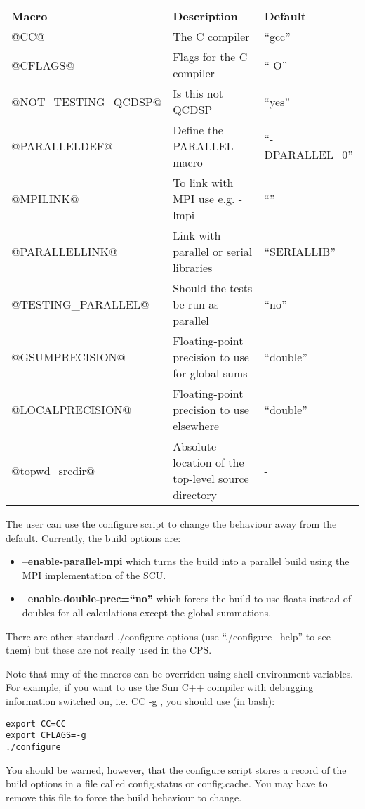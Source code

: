 \documentclass[12pt]{article}
\begin{document}
\begin{tabular}{lll}
{\bf Macro} & {\bf Description} & {\bf Default}\\
@CC@ & The C compiler & ``gcc'' \\
@CFLAGS@ & Flags for the C compiler & ``-O'' \\
@NOT\_TESTING\_QCDSP@ & Is this not QCDSP & ``yes'' \\
@PARALLELDEF@ & Define the PARALLEL macro & ``-DPARALLEL=0'' \\
@MPILINK@ & To link with MPI use e.g. -lmpi &  ``'' \\
@PARALLELLINK@ & Link with parallel or serial libraries & ``SERIALLIB'' \\
@TESTING\_PARALLEL@ & Should the tests be run as parallel & ``no'' \\
@GSUMPRECISION@ & Floating-point precision to use for global sums & ``double''
\\
@LOCALPRECISION@ & Floating-point precision to use elsewhere & ``double'' \\
@topwd\_srcdir@ & Absolute location of the top-level source directory & - \\
\end{tabular}

The user can use the configure script to change the behaviour away from the
default.  Currently, the build options are:
\begin{itemize}
\item {\bf --enable-parallel-mpi} which turns the build into a parallel build using
the MPI implementation of the SCU.
\item {\bf --enable-double-prec=``no''} which forces the build to use floats
instead of doubles for all calculations except the global summations.
\end{itemize}
There are other standard ./configure options (use ``./configure --help'' to
see them) but these are not really used in the CPS.

Note that mny of the macros can be overriden using shell environment
variables.  For example, if you want to use the Sun C++ compiler with
debugging information switched on, i.e. CC -g , you should use (in bash):

\begin{verbatim}
export CC=CC
export CFLAGS=-g
./configure
\end{verbatim}

You should be warned, however, that the configure script stores a record of
the build options in a file called config.status or config.cache.  You may have
to remove this file to force the build behaviour to change.
\end{document}
